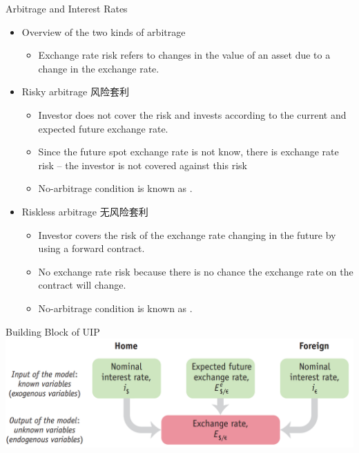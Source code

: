 \documentclass[10pt,hyperref={CJKbookmarks=true},xcolor=dvipsnames,aspectratio=169]{beamer}
\begin{document}
\begin{frame}{Arbitrage and Interest Rates}
	\begin{itemize}
		\item Overview of the two kinds of arbitrage
		\begin{itemize}
			\item Exchange rate risk refers to changes in the value of an asset due to a change in the exchange rate.
			
		\end{itemize}
		\item Risky arbitrage 风险套利
				\begin{itemize}
			\item Investor does not cover the risk and invests according to the current and expected future exchange rate. 
			\item Since the future spot exchange rate is not know, there is exchange rate risk – the investor is not covered against this risk
			\item No-arbitrage condition is known as .	
			
		\end{itemize}
		\item Riskless arbitrage 无风险套利	
				\begin{itemize}
			\item Investor covers the risk of the exchange rate changing in the future by using a forward contract. 
			\item No exchange rate risk because there is no chance the exchange rate on the contract will change. 
			\item No-arbitrage condition is known as .
			
			
		\end{itemize}	
		
	\end{itemize}
\end{frame}

\begin{frame}{Building Block of UIP}
	\centering
\includegraphics[scale=0.5]{fig/uip/building.png}
\end{frame}
\end{document}
